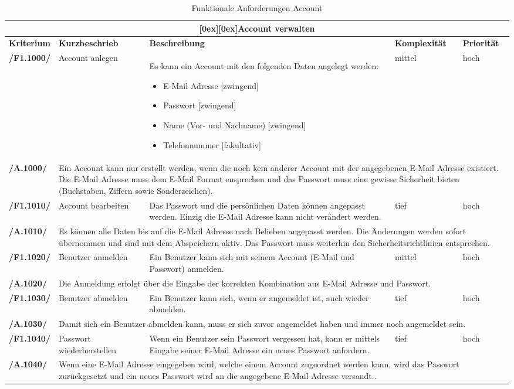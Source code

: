 \documentclass[10pt,a4paper,titlepage,twoside,german,final]{zhawreprt}
\newcommand{\AddRequirement}[2]{
\textbf{/#1#2/}
}
\newcommand{\F}[1]{
\AddRequirement{F1.}{#1}
}
\newcommand{\A}[1]{
\AddRequirement{A.}{#1}
}
\newcommand{\tableheader}[2]{\multicolumn{#1}{c}{\raisebox{-0.3em}[0ex][0ex]{\large{\textbf{#2}}}}}
\numberwithin{table}{chapter}
\begin{document}
\begin{table}[ht]\centering
\begin{longtable}{l|p{2.5cm}|p{5cm}|p{2cm}|p{1.5cm}}\hline
\tableheader{5}{Account verwalten}\\[0.3em]\hline
\textbf{Kriterium} & \textbf{Kurzbeschrieb} & \textbf{Beschreibung} & \textbf{Komplexität} & \textbf{Priorität}\\\hline
\F{1000} & Account anlegen & Es kann ein Account mit den folgenden Daten angelegt werden:\linebreak
\begin{itemize}
\item E-Mail Adresse [zwingend]
\item Passwort [zwingend]
\item Name (Vor- und Nachname) [zwingend]
\item Telefonnummer [fakultativ]
\end{itemize}
& mittel & hoch\\\hline
\A{1000}&\multicolumn{4}{p{10cm}|}{Ein Account kann nur erstellt werden, wenn die noch kein anderer Account mit der angegebenen E-Mail Adresse existiert. Die E-Mail Adresse muss dem E-Mail Format ensprechen und das Passwort muss eine gewisse Sicherheit bieten (Buchstaben, Ziffern sowie Sonderzeichen).}\\\hline
\F{1010} & Account bearbeiten & Das Passwort und die persönlichen Daten können angepasst werden. Einzig die E-Mail Adresse kann nicht verändert werden. & tief & hoch\\\hline
\A{1010}&\multicolumn{4}{p{10cm}|}{Es können alle Daten bis auf die E-Mail Adresse nach Belieben angepasst werden. Die Änderungen werden sofort übernommen und sind mit dem Abspeichern aktiv. Das Passwort muss weiterhin den Sicherheitsrichtlinien entsprechen.}\\\hline
\F{1020} & Benutzer anmelden & Ein Benutzer kann sich mit seinem Account (E-Mail und Passwort) anmelden. & mittel & hoch\\\hline
\A{1020}&\multicolumn{4}{p{10cm}|}{Die Anmeldung erfolgt über die Eingabe der korrekten Kombination aus E-Mail Adresse und Passwort.}\\\hline
\F{1030} & Benutzer abmelden & Ein Benutzer kann sich, wenn er angemeldet ist, auch wieder abmelden. & tief & hoch\\\hline
\A{1030}&\multicolumn{4}{p{10cm}|}{Damit sich ein Benutzer abmelden kann, muss er sich zuvor angemeldet haben und immer noch angemeldet sein.}\\\hline
\F{1040} & Passwort wiederherstellen & Wenn ein Benutzer sein Passwort vergessen hat, kann er mittels Eingabe seiner E-Mail Adresse ein neues Passwort anfordern. & tief & hoch\\\hline
\A{1040}&\multicolumn{4}{p{10cm}|}{Wenn eine E-Mail Adresse eingegeben wird, welche einem Account zugeordnet werden kann, wird das Passwort zurückgesetzt und ein neues Passwort wird an die angegebene E-Mail Adresse versandt..}\\\hline
\end{longtable}
\caption{Funktionale Anforderungen Account}\label{tbl:FuncAccount}
\end{table}
\end{document}
